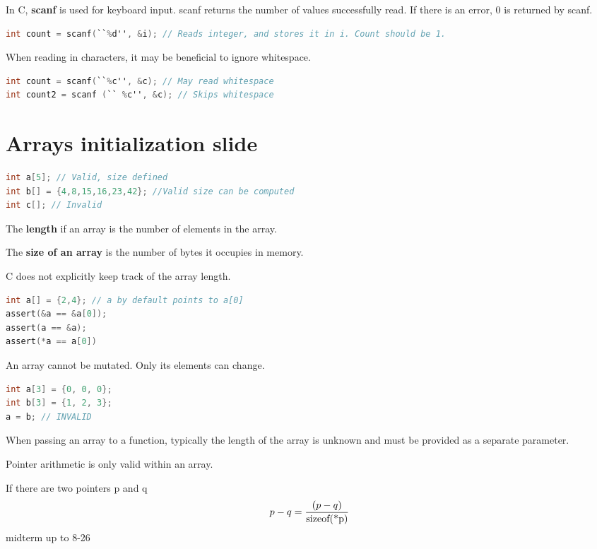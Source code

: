\documentclass[english, 12pt]{article}
\begin{document}
\begin{defn}
In C, \textbf{scanf} is used for keyboard input. scanf returns the number of values successfully read. If there is an error, 0 is returned by scanf.
\begin{lstlisting}[language=C]
int count = scanf(``%d'', &i); // Reads integer, and stores it in i. Count should be 1.
\end{lstlisting}
\end{defn}
\begin{note}
When reading in characters, it may be beneficial to ignore whitespace.
\begin{lstlisting}[language=C]
int count = scanf(``%c'', &c); // May read whitespace
int count2 = scanf (`` %c'', &c); // Skips whitespace
\end{lstlisting}
\end{note}

\section{Arrays initialization slide}
\begin{lstlisting}[language=C]
int a[5]; // Valid, size defined
int b[] = {4,8,15,16,23,42}; //Valid size can be computed
int c[]; // Invalid
\end{lstlisting}

\begin{defn}
The \textbf{length} if an array is the number of elements in the array.
\end{defn}

\begin{defn}
The \textbf{size of an array} is the number of bytes it occupies in memory.
\end{defn}

\begin{qte}
C does not explicitly keep track of the array length.
\end{qte}

\begin{lstlisting}[language=C]
int a[] = {2,4}; // a by default points to a[0]
assert(&a == &a[0]);
assert(a == &a);
assert(*a == a[0])
\end{lstlisting}

\begin{note}
An array cannot be mutated. Only its elements can change.
\begin{lstlisting}[language=C]
int a[3] = {0, 0, 0};
int b[3] = {1, 2, 3};
a = b; // INVALID
\end{lstlisting}
\end{note}

\begin{qte}
When passing an array to a function, typically the length of the array is unknown and must be provided as a separate parameter.
\end{qte}

\begin{qte}
Pointer arithmetic is only valid within an array.
\end{qte}

If there are two pointers p and q
\[p-q = \frac{(p-q)}{\text{sizeof(*p)}}\]
midterm up to 8-26
\end{document}
